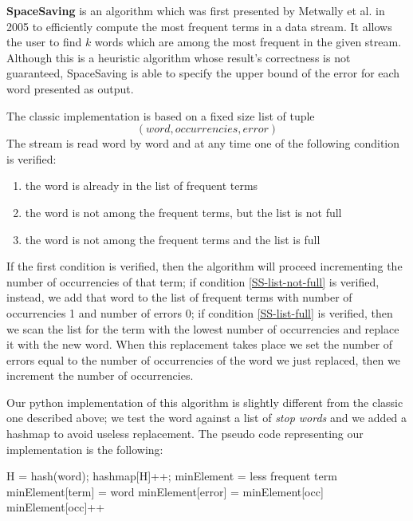 \textbf{SpaceSaving} \cite{SS} is an algorithm which was first presented by Metwally et al.
in 2005 to efficiently compute the most frequent terms in a data stream. It
allows the user to find $k$ words which are among the most frequent in the given
stream. 
Although this is a heuristic algorithm whose result’s correctness is not guaranteed, SpaceSaving is able to specify the upper bound of the error for each word presented as output.

The classic implementation is based on a fixed size list of tuple 
\begin{displaymath}
	(word, occurrencies, error)
\end{displaymath}
The stream is read word by word and at any time one of the following condition
is verified:
\begin{enumerate}
	\item \label{SS-among-frequent}
		the word is already in the list of frequent terms
	\item \label{SS-list-not-full}
		the word is not among the frequent terms, but the list is not full
	\item \label{SS-list-full}
		the word is not among the frequent terms and the list is full
\end{enumerate}
If the first condition is verified, then the algorithm will proceed incrementing
the number of occurrencies of that term; if condition \ref{SS-list-not-full} is
verified, instead, we add that word to the list of frequent terms with number of
occurrencies 1 and number of errors 0; if condition \ref{SS-list-full} is
verified, then we scan the list for the term with the lowest number of
occurrencies and replace it with the new word. When this replacement takes place
we set the number of errors equal to the number of occurrencies of the word we
just replaced, then we increment the number of occurrencies.

Our python implementation of this algorithm is slightly different from the
classic one described above; we test the word against a list of \emph{stop words}
and we added a hashmap to avoid useless replacement. The pseudo code representing
our implementation is the following:

\begin{algorithmic}
	\STATE H = hash(word);
	\STATE hashmap[H]++;
	    \STATE minElement = less frequent term
    	\STATE minElement[term] = word
    	\STATE minElement[error] = minElement[occ]
	    \STATE minElement[occ]++
	\ENDIF
	\ENDIF
\end{algorithmic}

